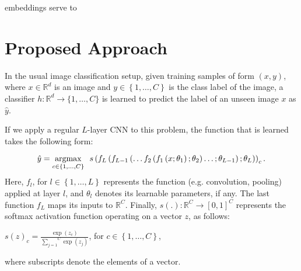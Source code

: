 \documentclass{bmvc2k}
\begin{document}
embeddings serve to%

\section{\label{sec:Proposed-Approach}Proposed Approach}

In the usual image classification setup, given training samples of form
$(x, y)$, where $x \in \mathbb{R}^d$ is an image and $y \in
\left\{1,\ldots,C\right\}$ is the class label of the image, a classifier $h : \mathbb{R}^d \to \{1,\ldots,C\}$ 
is learned to predict the label of an unseen image $x$ as $\hat{y}$.

If we apply a regular $L$-layer
CNN to this problem, the function that is learned takes the following form:

\begin{equation}
\hat{y}=\operatornamewithlimits{argmax}_{c\in\{1,\ldots,C\}}\enspace
s\left(f_{L}\left(f_{L-1}\left(\ldots f_{2}\left(f_{1}\left(x;\theta_{1}\right);
\theta_{2}\right)\ldots;\theta_{L-1}\right);\theta_{L}\right)\right)_c.\label{eq:CNN}
\end{equation}Here, $f_{l}$, for $l\in\left\{ 1,\ldots ,L\right\} $ represents the function
(e.g. convolution, pooling) applied at layer $l$, and $\theta_{l}$ denotes its
learnable parameters, if any. The last function $f_L$ maps its inputs to
$\mathbb{R}^C$. Finally, $s(.) : \mathbb{R}^C \to [0, 1]^C$ represents the
softmax activation function operating on a vector $z$, as follows: 

\begin{center}
$s(z)_{c}=\frac{\exp\left(z_{c}\right)}{\overset{C}{\underset{j=1}{\sum}}\exp\left(z_{j}\right)}$,
for $c\in\left\{ 1,\ldots ,C\right\} $,
\par\end{center}
where subscripts denote the elements of a vector.
\end{document}
